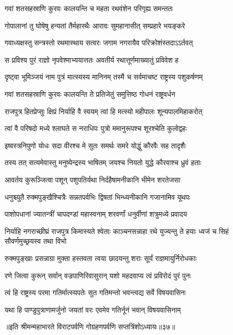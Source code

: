 \twolineshloka
{गवां शतसहस्राणि कुरवः कालयन्ति च}
{महता रथवंशेन परिगृह्य समन्ततः}


\twolineshloka
{गोपालानां तु घोषेषु हन्यतां तैर्महारथैः}
{आरावः सुमहानासीत् सम्प्रहारे भयङ्करे}


\twolineshloka
{गवाध्यक्षस्तु सन्त्रस्तो रथमास्थाय सत्वरः}
{जगाम नगरायैव परिक्रोशंस्तदाऽऽर्तवत्}


\twolineshloka
{स प्रविश्य पुरं राज्ञो नृपवेश्माभ्ययात्ततः}
{अवतीर्य रथात्तूर्णमाख्यातुं प्रविवेश ह}


\twolineshloka
{दृष्ट्वा भूमिञ्जयं नाम पुत्रं मात्स्यस्य मानिनम्}
{तस्मै च सर्वमाचष्ट राष्ट्रस्य पशुकर्षणम्}


\twolineshloka
{गवां शतसहस्राणि कुरवः कालयन्ति ते}
{प्रतिजेतुं समुत्तिष्ठ गोधनं राष्ट्रवर्धन}


\twolineshloka
{राजपुत्र हितप्रेप्सुः क्षिप्रं निर्याहि वै स्वयम्}
{त्वां हि मत्स्यो महीपालः शून्यपालमिहाकरोत्}


\twolineshloka
{त्वां वै परिषदो मध्ये श्लाघते स नराधिपः}
{पुत्रो ममानुरूपश्च शूरश्चेति कुलोद्वहः}


\twolineshloka
{इष्वस्त्रनिपुणो योधः सदा वीरश्च मे सुतः}
{समर्थः समरे योद्धुं कौरवैः सह तादृशैः}


\twolineshloka
{तस्य तत् सत्यमेवास्तु मनुष्येन्द्रस्य भाषितम्}
{जयश्च नियतो युद्धे कौरवाश्च ध्रुवं हताः}


\twolineshloka
{आवर्तय कुरूञ्जित्वा पशून् पशुपतिर्यथा}
{निर्दहैषामनीकानि भीमेन शरतेजसा}


\twolineshloka
{धनुश्च्युतै रुक्मपुङ्खैश्चित्रैः सन्नतपर्वभिः}
{द्विषतां भिन्ध्यनीकानि गजानामिव यूथपः}


\twolineshloka
{पाशोपधानां ज्यातन्त्रीं चापदण्डां महास्वनाम्}
{शरवर्णां धनुर्वीणां शत्रुमध्ये प्रवादय}


\threelineshloka
{निर्याहि नगराच्छीघ्रं राजपुत्र किमास्यते}
{श्वेताः काञ्चनसन्नाहा रथे युज्यन्तु ते हयाः}
{ध्वजं च सिहं सौवर्णमुच्छ्रयस्व तथा विभो}


\twolineshloka
{रुक्मपुङ्खाः प्रसन्नाग्रा मुक्ता हस्तवता त्वया}
{छादयन्तु शराः सूर्यं राज्ञमायुर्निरोधकाः}


\twolineshloka
{रणे जित्वा कुरून् सर्वान् वज्रपाणिरिवासुरान्}
{यशो महदवाप्य त्वं प्रविरोदं पुरं पुनः}


\twolineshloka
{त्वं हि राष्ट्रस्य परमा गतिर्मात्स्यपतेः सुत}
{गतिमन्तो भवन्त्वद्य सर्वे विषयवासिनः}


\twolineshloka
{यथा हि पाण्डुपुत्राणामर्जुनो जयतां वरः}
{एवमेव गतिर्नूनं भवान् विषयवासिनाम्}

॥इति श्रीमन्महाभारते विराटपर्वणि गोग्रहणपर्वणि सप्तत्रिंशोऽध्यायः॥३७॥

